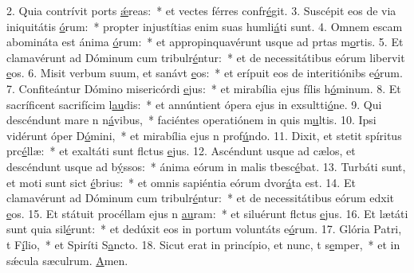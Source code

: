 2. Quia contrívit ports \uline{ǽ}reas:~* et vectes férres confr\uline{é}git.
3. Suscépit eos de via iniquitátis \uline{ó}rum:~* propter injustítias enim suas humli\uline{á}ti sunt.
4. Omnem escam abomináta est ánima \uline{ó}rum:~* et appropinquavérunt usque ad prtas m\uline{o}rtis.
5. Et clamavérunt ad Dóminum cum tribulr\uline{é}ntur:~* et de necessitátibus eórum libervit \uline{e}os.
6. Misit verbum suum, et sanávt \uline{e}os:~* et erípuit eos de interitiónibs e\uline{ó}rum.
7. Confiteántur Dómino misericórdi \uline{e}jus:~* et mirabília ejus fílis h\uline{ó}minum.
8. Et sacríficent sacrifícim l\uline{au}dis:~* et annúntient ópera ejus in exsultti\uline{ó}ne.
9. Qui descéndunt mare n n\uline{á}vibus,~* faciéntes operatiónem in quis m\uline{u}ltis.
10. Ipsi vidérunt óper D\uline{ó}mini,~* et mirabília ejus n prof\uline{ú}ndo.
11. Dixit, et stetit spíritus prc\uline{é}llæ:~* et exaltáti sunt flctus \uline{e}jus.
12. Ascéndunt usque ad cælos, et descéndunt usque ad b\uline{ý}ssos:~* ánima eórum in malis tbesc\uline{é}bat.
13. Turbáti sunt, et moti sunt sict \uline{é}brius:~* et omnis sapiéntia eórum dvor\uline{á}ta est.
14. Et clamavérunt ad Dóminum cum tribulr\uline{é}ntur:~* et de necessitátibus eórum edxit \uline{e}os.
15. Et státuit procéllam ejus n \uline{au}ram:~* et siluérunt flctus \uline{e}jus.
16. Et lætáti sunt quia sil\uline{é}runt:~* et dedúxit eos in portum voluntáts e\uline{ó}rum.
17. Glória Patri, t F\uline{í}lio,~* et Spiríti S\uline{a}ncto.
18. Sicut erat in princípio, et nunc, t s\uline{e}mper,~* et in sǽcula sæculrum. \uline{A}men.
